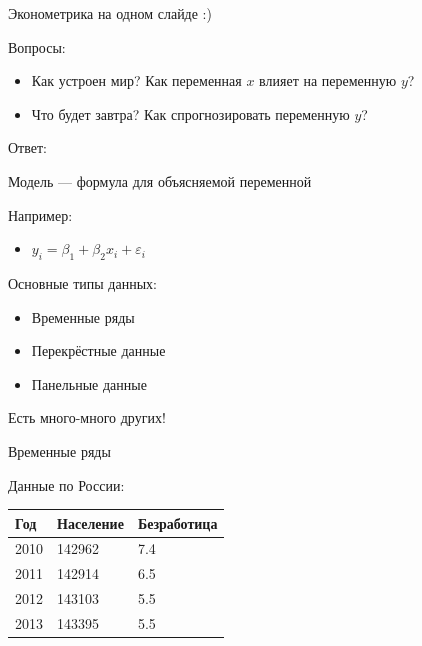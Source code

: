 \begin{frame}{Эконометрика на одном слайде :)}

\begin{block}{Вопросы:}

\begin{itemize}
\tightlist
\item
  Как устроен мир? Как переменная \(x\) влияет на переменную \(y\)?
\item
  Что будет завтра? Как спрогнозировать переменную \(y\)?
\end{itemize}

\end{block}

\begin{block}{Ответ:}

Модель --- формула для объясняемой переменной

\end{block}

\begin{block}{Например:}

\begin{itemize}
\tightlist
\item
  \(y_i=\beta_1+\beta_2 x_i + \varepsilon_i\) 
\end{itemize}

\end{block}

\end{frame}

\begin{frame}{Основные типы данных:}

\begin{itemize}
\tightlist
\item
  Временные ряды
\item
  Перекрёстные данные
\item
  Панельные данные
\end{itemize}

Есть много-много других!

\end{frame}

\begin{frame}{Временные ряды}

Данные по России:

\begin{longtable}[c]{@{}lll@{}}
\toprule
Год & Население & Безработица\tabularnewline
\midrule
\endhead
2010 & 142962 & 7.4\tabularnewline
2011 & 142914 & 6.5\tabularnewline
2012 & 143103 & 5.5\tabularnewline
2013 & 143395 & 5.5\tabularnewline
\bottomrule
\end{longtable}

\end{frame}

